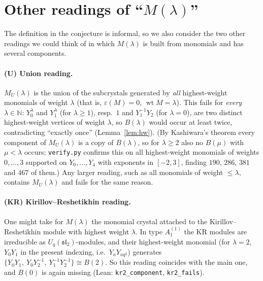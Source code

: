 \documentclass[11pt]{article}
\theoremstyle{definition}
\theoremstyle{remark}
\newcommand{\wt}{\operatorname{wt}}
\begin{document}
\section{Other readings of ``\texorpdfstring{$M(\lambda)$}{M(lambda)}''}
The definition in the conjecture is informal, so we also consider the two
other readings we could think of in which $M(\lambda)$ is built from monomials
and has several components.

\paragraph{(U) Union reading.} $M_U(\lambda)$ is the union of the subcrystals
generated by \emph{all} highest-weight monomials of weight $\lambda$ (that is,
$\varepsilon(M)=0$, $\wt M=\lambda$). This fails for \emph{every}
$\lambda\in\mathbb N$: $Y_0^\lambda$ and $Y_1^\lambda$ (for $\lambda\ge1$), resp.\ $1$ and
$Y_1^{-1}Y_2$ (for $\lambda=0$), are two distinct highest-weight vertices of
weight $\lambda$, so $B(\lambda)$ would occur at least twice, contradicting
``exactly once'' (Lemma~\ref{lem:hw}). (By Kashiwara's theorem every component
of $M_U(\lambda)$ is a copy of $B(\lambda)$, so for $\lambda\ge2$ also no
$B(\mu)$ with $\mu<\lambda$ occurs; \texttt{verify.py} confirms this on all
highest-weight monomials of weights $0,\dots,3$ supported on $Y_0,\dots,Y_4$
with exponents in $[-2,3]$, finding $190$, $286$, $381$ and $467$ of them.)
Any larger reading, such as all monomials of weight $\le\lambda$, contains
$M_U(\lambda)$ and fails for the same reason.

\paragraph{(KR) Kirillov--Reshetikhin reading.} One might take for $M(\lambda)$
the monomial crystal attached to the Kirillov--Reshetikhin module with highest
weight $\lambda$. In type $A_1^{(1)}$ the KR modules are irreducible as
$U_q(\mathfrak{sl}_2)$-modules, and their highest-weight monomial (for
$\lambda=2$, $Y_0Y_1$ in the present indexing, i.e.\ $Y_aY_{aq^2}$) generates
$\{Y_0Y_1,\ Y_0Y_2^{-1},\ Y_1^{-1}Y_2^{-1}\}\cong B(2)$. So this reading
coincides with the main one, and $B(0)$ is again missing (Lean:
\texttt{kr2\_component}, \texttt{kr2\_fails}).
\end{document}

